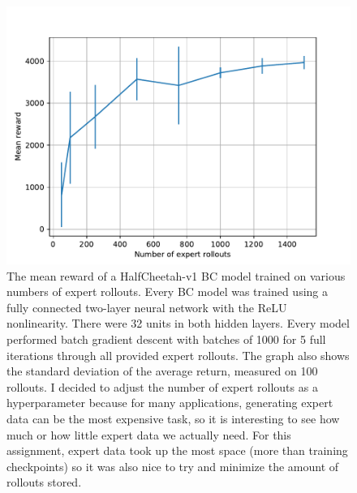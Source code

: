 \documentclass{mwhittaker}
\begin{document}
\begin{figure}[h]
  \centering
  \includegraphics[width=\textwidth]{cheetah.pdf}
  \caption{
    The mean reward of a HalfCheetah-v1 BC model trained on various numbers of
    expert rollouts. Every BC model was trained using a fully connected
    two-layer neural network with the ReLU nonlinearity. There were 32 units in
    both hidden layers. Every model performed batch gradient descent with
    batches of 1000 for 5 full iterations through all provided expert rollouts.
    The graph also shows the standard deviation of the average return, measured
    on 100 rollouts. I decided to adjust the number of expert rollouts as a
    hyperparameter because for many applications, generating expert data can be
    the most expensive task, so it is interesting to see how much or how little
    expert data we actually need. For this assignment, expert data took up the
    most space (more than training checkpoints) so it was also nice to try and
    minimize the amount of rollouts stored.
  }
\end{figure}
\end{document}
